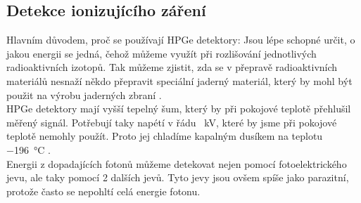 \documentclass[12pt,a4paper]{article}
\begin{document}
\begin{spacing}{1.5}
\section{Detekce ionizujícího záření}
Hlavním důvodem, proč se používají HPGe detektory: 
Jsou lépe schopné určit, o jakou energii se jedná, čehož můžeme využít při rozlišování jednotlivých radioaktivních izotopů. Tak můžeme zjistit, zda se v přepravě radioaktivních materiálů nesnaží někdo přepravit speciální jaderný materiál, který by mohl být použit na výrobu jaderných zbraní \cite{isotopeIdent}.\\ 
HPGe detektory mají vyšší tepelný šum, který by při pokojové teplotě přehlušil měřený signál. Potřebují taky napétí v řádu \SI{}{\kilo\volt}, které by jsme při pokojové teplotě nemohly použít. Proto jej chladíme kapalným dusíkem na teplotu \SI{-196}{\degreeCelsius} \cite{comprarsion,zlin2010}.\\ %
Energii z dopadajících fotonů můžeme detekovat nejen pomocí fotoelektrického jevu, ale taky pomocí 2 dalších jevů. Tyto jevy jsou ovšem spíše jako parazitní, protože často se nepohltí celá energie fotonu.\\

\end{spacing}
\end{document}
